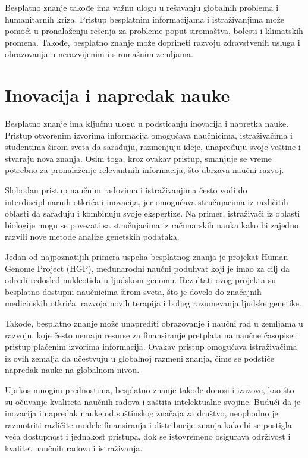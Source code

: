 \documentclass[a4paper]{article}
\begin{document}
{Besplatno znanje takođe ima važnu ulogu u rešavanju globalnih problema i humanitarnih kriza. Pristup besplatnim informacijama i istraživanjima može pomoći u pronalaženju rešenja za probleme poput siromaštva, bolesti i klimatskih promena. Takođe, besplatno znanje može doprineti razvoju zdravstvenih usluga i obrazovanja u nerazvijenim i siromašnim zemljama.




\setlength{\parskip}{1em}

\section{Inovacija i napredak nauke}
\label{sec:Inovacija i napredak nauke}


Besplatno znanje ima ključnu ulogu u podsticanju inovacija i napretka nauke. Pristup otvorenim izvorima informacija omogućava naučnicima, istraživačima i studentima širom sveta da sarađuju, razmenjuju ideje, unapređuju svoje veštine i stvaraju nova znanja. Osim toga, kroz ovakav pristup, smanjuje se vreme potrebno za pronalaženje relevantnih informacija, što ubrzava naučni razvoj.

Slobodan pristup naučnim radovima i istraživanjima često vodi do interdisciplinarnih otkrića i inovacija, jer omogućava stručnjacima iz različitih oblasti da sarađuju i kombinuju svoje ekspertize. Na primer, istraživači iz oblasti biologije mogu se povezati sa stručnjacima iz računarskih nauka kako bi zajedno razvili nove metode analize genetskih podataka.

Jedan od najpoznatijih primera uspeha besplatnog znanja je projekat Human Genome Project (HGP), međunarodni naučni poduhvat koji je imao za cilj da odredi redosled nukleotida u  ljudskom genomu. Rezultati ovog projekta su besplatno dostupni naučnicima širom sveta, što je dovelo do značajnih medicinskih otkrića, razvoja novih terapija i boljeg razumevanja ljudske genetike.

Takođe, besplatno znanje može unaprediti obrazovanje i naučni rad u zemljama u razvoju, koje često nemaju resurse za finansiranje pretplata na naučne časopise i pristup plaćenim izvorima informacija. Ovakav pristup omogućava istraživačima iz ovih zemalja da učestvuju u globalnoj razmeni znanja, čime se podstiče napredak nauke na globalnom nivou.

Uprkos mnogim prednostima, besplatno znanje takođe donosi i izazove, kao što su očuvanje kvaliteta naučnih radova i zaštita intelektualne svojine. Budući da je inovacija i napredak nauke od suštinskog značaja za društvo, neophodno je razmotriti različite modele finansiranja i distribucije znanja kako bi se postigla veća dostupnost i jednakost pristupa, dok se istovremeno osigurava održivost i kvalitet naučnih radova i istraživanja.


}
\end{document}
